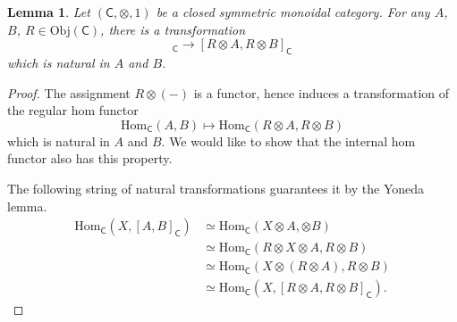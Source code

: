 \documentclass[a4paper,10pt]{scrreprt}
\newcommand{\Obj}{\mathrm{Obj}}
\newcommand{\Hom}{\mathrm{Hom}}
\theoremstyle{definition}
\theoremstyle{plain}
\newtheorem{lemma}{Lemma}[section]
\theoremstyle{remark}
\begin{document}
\begin{lemma}
  \label{lemma:cantensorbothsidesofinternalhom}
  Let $(\mathsf{C}, \otimes, 1)$ be a closed symmetric monoidal category. For any $A$, $B$, $R \in \Obj(\mathsf{C})$, there is a transformation
  \begin{equation*}
    [A, B]_{\mathsf{C}} \to [R \otimes A, R \otimes B]_{\mathsf{C}}
  \end{equation*}
  which is natural in $A$ and $B$.
\end{lemma}
\begin{proof}
  The assignment $R \otimes (-)$ is a functor, hence induces a transformation of the regular hom functor
  \begin{equation*}
    \Hom_{\mathsf{C}}(A, B) \mapsto \Hom_{\mathsf{C}}(R \otimes A, R \otimes B)
  \end{equation*}
  which is natural in $A$ and $B$. We would like to show that the internal hom functor also has this property.

  The following string of natural transformations guarantees it by the Yoneda lemma.
  \begin{align*}
    \Hom_{\mathsf{C}}(X, [A, B]_{\mathsf{C}}) &\simeq \Hom_{\mathsf{C}}(X \otimes A, \otimes B) \\
    &\simeq \Hom_{\mathsf{C}}(R \otimes X \otimes A, R \otimes B) \\
    &\simeq \Hom_{\mathsf{C}}(X \otimes (R \otimes A), R \otimes B) \\
    & \simeq \Hom_{\mathsf{C}}(X, [R \otimes A, R \otimes B]_{\mathsf{C}}).
  \end{align*}
\end{proof}
\end{document}
